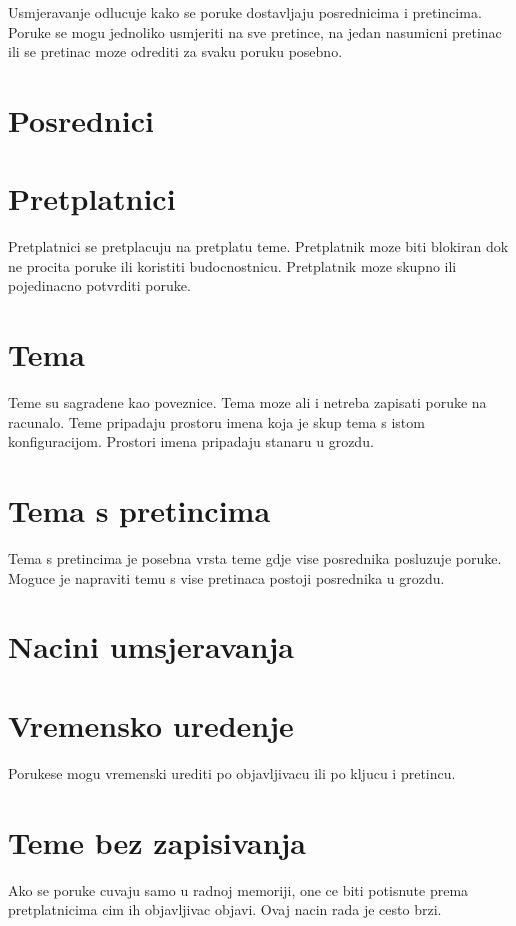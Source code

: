 \documentclass[times, utf8, diplomski, numeric]{fer}
\begin{document}
Usmjeravanje odlucuje kako se poruke dostavljaju posrednicima i pretincima. Poruke se mogu jednoliko usmjeriti na sve pretince, na jedan nasumicni pretinac ili se pretinac moze odrediti za svaku poruku posebno. 




\chapter{Posrednici}



\chapter{Pretplatnici}
Pretplatnici se pretplacuju na pretplatu teme. Pretplatnik moze biti blokiran dok ne procita poruke ili koristiti budocnostnicu. Pretplatnik moze skupno ili pojedinacno potvrditi poruke.

\chapter{Tema}
Teme su sagradene kao poveznice. Tema moze ali i netreba zapisati poruke na racunalo. Teme pripadaju prostoru imena koja je skup tema s istom konfiguracijom. Prostori imena pripadaju stanaru u grozdu. 

\chapter{Tema s pretincima}
Tema s pretincima je posebna vrsta teme gdje vise posrednika posluzuje poruke. Moguce je napraviti temu s vise pretinaca postoji posrednika u grozdu. 

\chapter{Nacini umsjeravanja}


\chapter{Vremensko uredenje}
Porukese mogu vremenski urediti po objavljivacu ili po kljucu i pretincu.

\chapter{Teme bez zapisivanja}
Ako se poruke cuvaju samo u radnoj memoriji, one ce biti potisnute prema pretplatnicima cim ih objavljivac objavi. Ovaj nacin rada je cesto brzi.
\end{document}
